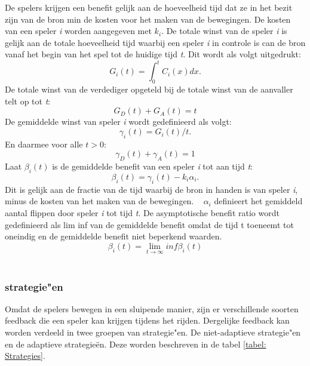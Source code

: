 \documentclass[master=cws, masteroption=vs]{kulemt}
\begin{document}
\begin{abstract*}
De spelers krijgen een benefit gelijk aan de hoeveelheid tijd dat ze in het bezit zijn van de bron min de kosten voor het maken van de bewegingen. De kosten van een speler \textit{i} worden aangegeven met $ k_{i} $.
De totale winst van de speler \textit{i} is gelijk aan de totale hoeveelheid tijd waarbij een speler \textit{i} in controle is can de bron vanaf het begin van het spel tot de huidige tijd \textit{t}. Dit wordt als volgt uitgedrukt:
\begin{equation}
G_{i}(t) = \int_0^t \! C_{i}(x) dx.
\end{equation}
De totale winst van de verdediger opgeteld bij de totale winst van de aanvaller telt op tot \textit{t}:
\begin{equation} 
G_{D}(t) + G_{A}(t) = t
\end{equation}
De gemiddelde winst van speler \textit{i} wordt gedefinieerd als volgt:
\begin{equation}
\gamma_{i}(t) = G_{i}(t) / t.
\end{equation}
En daarmee voor alle $ t> 0 $:
\begin{equation} 
\gamma_{D}(t) + \gamma_{A}(t) = 1
\end{equation}
Laat $ \beta_{i}(t) $ is de gemiddelde benefit van een speler \textit{i} tot aan tijd \textit{t}:
\begin{equation}
\beta_{i}(t) = \gamma_{i}(t) - k_{i} \alpha_{i}.
\end{equation}
Dit is gelijk aan de fractie van de tijd waarbij de bron in handen is van speler \textit{i}, minus de kosten van het maken van de bewegingen. ~ $ \alpha_{i} $ definieert het gemiddeld aantal flippen door speler \textit{i} tot tijd \textit{t}.
De asymptotische benefit ratio wordt gedefinieerd als lim inf van de gemiddelde benefit omdat de tijd t toeneemt tot oneindig en de gemiddelde benefit niet beperkend waarden.
\begin{equation}
\beta_{i} (t) = \lim_{t \to \infty } inf \beta_{i}(t)
\end{equation}
\\

\subsubsection{strategie"en}
Omdat de spelers bewegen in een sluipende manier, zijn er verschillende soorten feedback die een speler kan krijgen tijdens het rijden. Dergelijke feedback kan worden verdeeld in twee groepen van strategie"en. De niet-adaptieve strategie"en en de adaptieve strategie\"en. Deze worden beschreven in de tabel \ref{tabel: Strategies}. \\


\end{abstract*}
\end{document}
